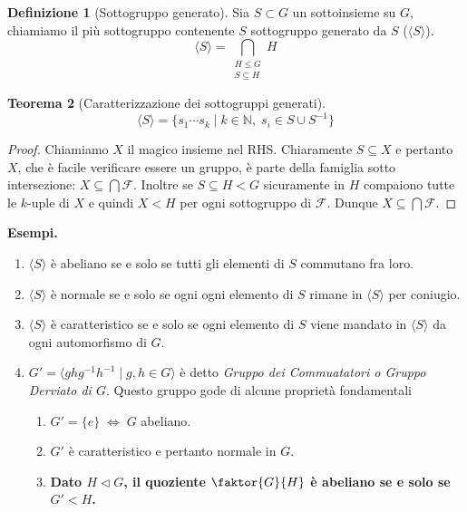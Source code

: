 \documentclass[a4paper]{article}
\newtheorem{theorem}{Teorema}[section]
\theoremstyle{remark}
\theoremstyle{definition}
\newtheorem{definition}[theorem]{Definizione}
\begin{document}
\begin{multicols}{2}
\begin{definition}[Sottogruppo generato]
	Sia $ S \subset G $ un sottoinsieme su $ G $, chiamiamo il più sottogruppo contenente $ S $  sottogruppo generato da $ S $ ($ \langle S \rangle $). \[ \langle S \rangle = \bigcap_{\substack{H \leq G \\ S \subseteq H }} H  \]
\end{definition}
\begin{theorem}[Caratterizzazione dei sottogruppi generati]
	\[ \langle S \rangle = \{ s_1 \cdots s_k \mid k \in \mathbb{N}, \; s_i \in S \cup S^{-1} \} \]
\end{theorem}
\begin{proof}
	Chiamiamo $ X $ il magico insieme nel RHS. Chiaramente $ S \subseteq X $ e pertanto $ X $, che è facile verificare essere un gruppo, è parte della famiglia sotto intersezione: $ X \subseteq \bigcap \mathcal{F} $. Inoltre se $S \subseteq H < G $ sicuramente in $ H $ compaiono tutte le $ k $-uple di $ X $ e quindi $ X < H $ per ogni sottogruppo di $ \mathcal{F} $. Dunque $ X \subseteq \bigcap\mathcal{F} $.
\end{proof}

\textbf{Esempi.}
\begin{enumerate}
	\item $ \langle S \rangle $ è abeliano se e solo se tutti gli elementi di $ S $ commutano fra loro.
	\item $ \langle S \rangle $ è normale se e solo se ogni ogni elemento di $ S $ rimane in $ \langle S \rangle $ per coniugio.
	\item $ \langle S \rangle $ è caratteristico se e solo se ogni elemento di $ S $ viene mandato in $ \langle S \rangle $ da ogni automorfismo di $ G $.
	\item $ G' = \langle ghg^{-1}h^{-1} \mid g, h \in G \rangle $ è detto \emph{Gruppo dei Commuatatori o Gruppo Derviato di $ G $}. Questo gruppo gode di alcune proprietà fondamentali
	
	\begin{enumerate}
		\item $ G' = \{ e \} \;\Leftrightarrow\; G $ abeliano.
		\item $ G' $ è caratteristico e pertanto normale in $ G $.
		\item \textbf{Dato $ H \lhd G $, il quoziente $ \faktor{G}{H} $ è abeliano se e solo se $ G' < H $.}
	
		
	\end{enumerate}


\end{enumerate}
\end{multicols}
\end{document}
